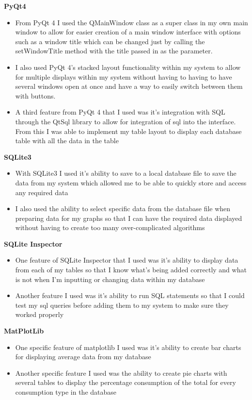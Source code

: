 \textbf{PyQt4}
\begin{itemize}
	\item From PyQt 4 I used the QMainWindow class as a super class in my own main window to allow for easier creation of a main window interface with options such as a window title which can be changed just by calling the setWindowTitle method with the title passed in as the parameter.
	\item I also used PyQt 4's stacked layout functionality within my system to allow for multiple displays within my system without having to having to have several windows open at once and have a way to easily switch between them with buttons.
	\item A third feature from PyQt 4 that I used was it's integration with SQL through the QtSql library to allow for integration of sql into the interface. From this I was able to implement my table layout to display each database table with all the data in the table
\end{itemize}

\textbf{SQLite3}
\begin{itemize}
	\item With SQLite3 I used it's ability to save to a local database file to save the data from my system which allowed me to be able to quickly store and access any required data
	\item I also used the ability to select specific data from the database file when preparing data for my graphs so that I can have the required data displayed without having to create too many over-complicated algorithms
\end{itemize}

\textbf{SQLite Inspector}
\begin{itemize}
	\item One feature of SQLite Inspector that I used was it's ability to display data from each of my tables so that I know what's being added correctly and what is not when I'm inputting or changing data within my database
	\item Another feature I used was it's ability to run SQL statements so that I could test my sql queries before adding them to my system to make sure they worked properly
\end{itemize}

\textbf{MatPlotLib}
\begin{itemize}
	\item One specific feature of matplotlib I used was it's ability to create bar charts for displaying average data from my database
	\item Another specific feature I used was the ability to create pie charts with several tables to display the percentage consumption of the total for every consumption type in the database
\end{itemize}

